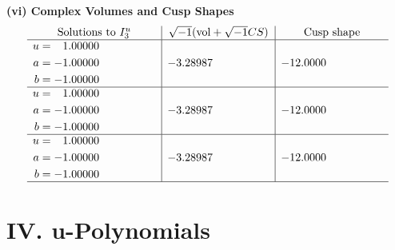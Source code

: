 \documentclass[1p]{elsarticle_modified}
\theoremstyle{definition}
\newcommand{\I}{\sqrt{-1}}
\begin{document}
\newpage\flushleft \textbf{(vi) Complex Volumes and Cusp Shapes}
$$\begin{array}{c|c|c}  
\text{Solutions to }I^u_{3}& \I (\text{vol} + \sqrt{-1}CS) & \text{Cusp shape}\\
 \hline 
\begin{aligned}
u &= \phantom{-}1.00000\phantom{ +0.000000I} \\
a &= -1.00000\phantom{ +0.000000I} \\
b &= -1.00000\phantom{ +0.000000I}\end{aligned}
 & -3.28987\phantom{ +0.000000I} & -12.0000\phantom{ +0.000000I} \\ \hline\begin{aligned}
u &= \phantom{-}1.00000\phantom{ +0.000000I} \\
a &= -1.00000\phantom{ +0.000000I} \\
b &= -1.00000\phantom{ +0.000000I}\end{aligned}
 & -3.28987\phantom{ +0.000000I} & -12.0000\phantom{ +0.000000I} \\ \hline\begin{aligned}
u &= \phantom{-}1.00000\phantom{ +0.000000I} \\
a &= -1.00000\phantom{ +0.000000I} \\
b &= -1.00000\phantom{ +0.000000I}\end{aligned}
 & -3.28987\phantom{ +0.000000I} & -12.0000\phantom{ +0.000000I}\\
 \hline 
 \end{array}$$\newpage
\newpage\renewcommand{\arraystretch}{1}
\centering \section*{ IV. u-Polynomials}
\end{document}
